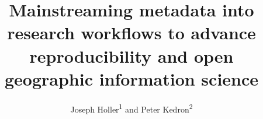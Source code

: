 \documentclass{isprs} %
\begin{document}
\title{Mainstreaming metadata into research workflows to advance reproducibility and open geographic information science}
\date{}


\author{Joseph Holler\textsuperscript{1} and Peter Kedron\textsuperscript{2}}

\address{\textsuperscript{1}Department of Geography, Middlebury College - josephh@middlebury.edu \\
\textsuperscript{2}School of Geographical Sciences and Urban Planning, Arizona State University - peter.kedron@asu.edu}




\commission{}{} %
\workinggroup{} %
\icwg{}   %
\end{document}
